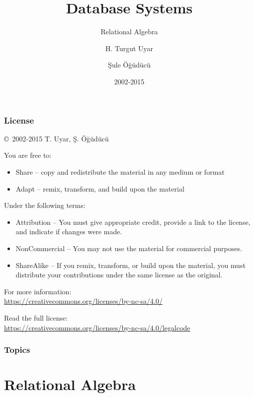 \documentclass[dvipsnames]{beamer}
\title{Database Systems}
\subtitle{Relational Algebra}
\author{H. Turgut Uyar \and Şule Öğüdücü}
\date{2002-2015}
\theoremstyle{plain}
\begin{document}
\begin{frame}
  \titlepage
\end{frame}

\begin{frame}
  \frametitle{License}

  \hfill
  \copyright~2002-2015 T. Uyar, Ş. Öğüdücü

  \vfill
  \begin{footnotesize}
    You are free to:
    \begin{itemize}
      \itemsep0em
      \item Share -- copy and redistribute the material in any medium or format
      \item Adapt -- remix, transform, and build upon the material
    \end{itemize}

    Under the following terms:
    \begin{itemize}
      \itemsep0em
      \item Attribution -- You must give appropriate credit, provide a link to
        the license, and indicate if changes were made.

      \item NonCommercial -- You may not use the material for commercial
        purposes.

      \item ShareAlike -- If you remix, transform, or build upon the material,
        you must distribute your contributions under the same license as the
        original.
    \end{itemize}
  \end{footnotesize}

  \begin{small}
    For more information:\\
    \url{https://creativecommons.org/licenses/by-nc-sa/4.0/}

    \smallskip
    Read the full license:\\
    \url{https://creativecommons.org/licenses/by-nc-sa/4.0/legalcode}
  \end{small}
\end{frame}

\begin{frame}
  \frametitle{Topics}
  \tableofcontents
\end{frame}

\lstset{language=TutorialD}

\section{Relational Algebra}
\end{document}
